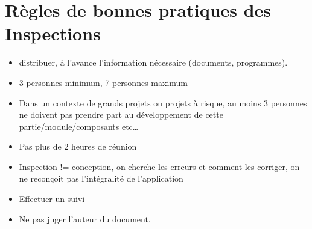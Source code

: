 \section{Règles de bonnes pratiques des Inspections}

\begin{itemize}
\item distribuer, à l'avance l'information nécessaire (documents, programmes).
\item 3 personnes minimum, 7 personnes maximum
\item Dans un contexte de grands projets ou projets à risque, au moins 3 personnes ne doivent pas prendre part au développement de cette partie/module/composants etc\ldots
\item Pas plus de 2 heures de réunion
\item Inspection != conception, on cherche les erreurs et comment les corriger, on ne reconçoit pas l’intégralité de l’application
\item Effectuer un suivi
\item Ne pas juger l’auteur du document.
\end{itemize}
